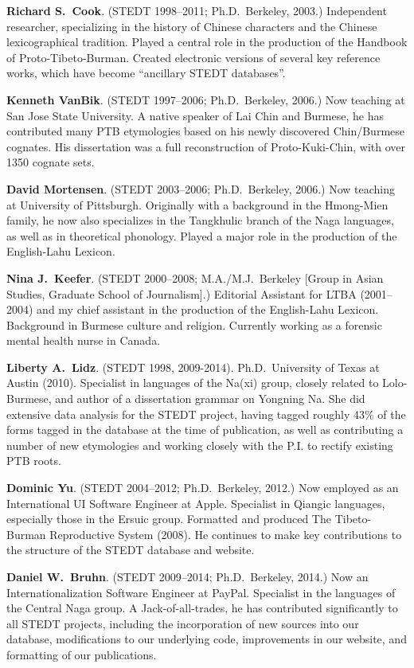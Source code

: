 \textbf{Richard S.\ Cook}. (STEDT 1998–2011; Ph.D.\ Berkeley, 2003.) Independent researcher, specializing in the history of Chinese characters and the Chinese lexicographical tradition. Played a central role in the production of the Handbook of Proto-Tibeto-Burman. Created electronic versions of several key reference works, which have become “ancillary STEDT databases”.

\textbf{Kenneth VanBik}. (STEDT 1997–2006; Ph.D.\ Berkeley, 2006.) Now teaching at San Jose State University. A native speaker of Lai Chin and Burmese, he has contributed many PTB etymologies based on his newly discovered Chin/Burmese cognates. His dissertation was a full reconstruction of Proto-Kuki-Chin, with over 1350 cognate sets.

\textbf{David Mortensen}. (STEDT 2003–2006; Ph.D.\ Berkeley, 2006.) Now teaching at University of Pittsburgh. Originally with a background in the Hmong-Mien family, he now also specializes in the Tangkhulic branch of the Naga languages, as well as in theoretical phonology. Played a major role in the production of the English-Lahu Lexicon.

\textbf{Nina J.\ Keefer}. (STEDT 2000–2008; M.A./M.J.\ Berkeley [Group in Asian Studies, Graduate School of Journalism].) Editorial Assistant for LTBA (2001–2004) and my chief assistant in the production of the English-Lahu Lexicon. Background in Burmese culture and religion. Currently working as a forensic mental health nurse in Canada.

\textbf{Liberty A.\ Lidz}. (STEDT 1998, 2009-2014). Ph.D.\ University of Texas at Austin (2010). Specialist in languages of the Na(xi) group, closely related to Lolo-Burmese, and author of a dissertation grammar on Yongning Na. She did extensive data analysis for the STEDT project, having tagged roughly 43\% of the forms tagged in the database at the time of publication, as well as contributing a number of new etymologies and working closely with the P.I. to rectify existing PTB roots.

\textbf{Dominic Yu}. (STEDT 2004–2012; Ph.D.\ Berkeley, 2012.) Now employed as an International UI Software Engineer at Apple. Specialist in Qiangic languages, especially those in the Ersuic group. Formatted and produced The Tibeto-Burman Reproductive System (2008). He continues to make key contributions to the structure of the STEDT database and website.

\textbf{Daniel W.\ Bruhn}. (STEDT 2009–2014; Ph.D.\ Berkeley, 2014.) Now an Internationalization Software Engineer at PayPal. Specialist in the languages of the Central Naga group. A Jack-of-all-trades, he has contributed significantly to all STEDT projects, including the incorporation of new sources into our database, modifications to our underlying code, improvements in our website, and formatting of our publications.

